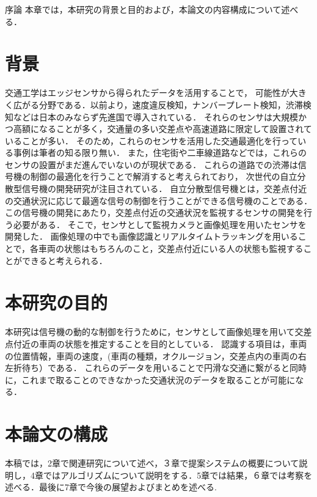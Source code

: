\chapterhead
{序論}
{本章では，本研究の背景と目的および，本論文の内容構成について述べる．}

\section{背景}
交通工学はエッジセンサから得られたデータを活用することで，
可能性が大きく広がる分野である．以前より，速度違反検知，ナンバープレート検知，渋滞検知などは日本のみならず先進国で導入されている．
それらのセンサは大規模かつ高額になることが多く，交通量の多い交差点や高速道路に限定して設置されていることが多い．
そのため，これらのセンサを活用した交通最適化を行っている事例は筆者の知る限り無い．
また，住宅街や二車線道路などでは，これらのセンサの設置がまだ進んでいないのが現状である．
これらの道路での渋滞は信号機の制御の最適化を行うことで解消すると考えられており，
次世代の自立分散型信号機の開発研究が注目されている．
自立分散型信号機とは，交差点付近の交通状況に応じて最適な信号の制御を行うことができる信号機のことである．
この信号機の開発にあたり，交差点付近の交通状況を監視するセンサの開発を行う必要がある．
そこで，センサとして監視カメラと画像処理を用いたセンサを開発した．
画像処理の中でも画像認識とリアルタイムトラッキングを用いることで，各車両の状態はもちろんのこと，交差点付近にいる人の状態も監視することができると考えられる．%

\section{本研究の目的}
本研究は信号機の動的な制御を行うために，センサとして画像処理を用いて交差点付近の車両の状態を推定することを目的としている．
認識する項目は，車両の位置情報，車両の速度，(車両の種類，オクルージョン，交差点内の車両の右左折待ち）である．%
これらのデータを用いることで円滑な交通に繋がると同時に，これまで取ることのできなかった交通状況のデータを取ることが可能になる．


\section{本論文の構成}
本稿では，2章で関連研究について述べ，３章で提案システムの概要について説明し，4章ではアルゴリズムについて説明をする．5章では結果，６章では考察を述べる．最後に7章で今後の展望およびまとめを述べる.


\newpage
